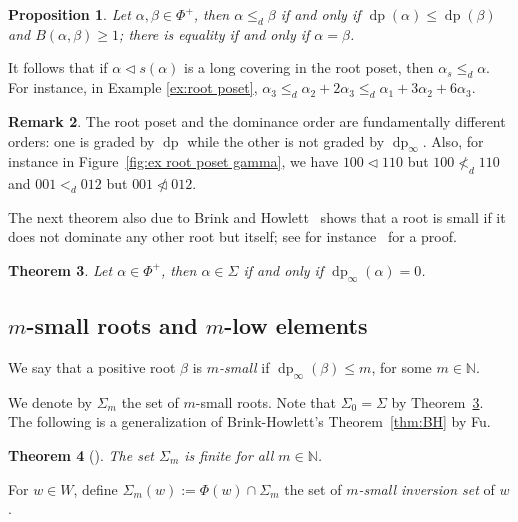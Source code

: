 \documentclass{amsart}
\newtheorem{Theorem}{Theorem}[section]
\newtheorem{Proposition}[Theorem]{Proposition}
\theoremstyle{definition}
\newtheorem{Remark}[Theorem]{Remark}
\newcommand{\dep}{\operatorname{dp}}
\begin{document}
\begin{Proposition}\label{prop:dom}
    Let $\alpha,\beta\in\Phi^+$, then $\alpha\leq_d\beta$ if and only if $\dep(\alpha)\leq \dep(\beta)$ and $B(\alpha, \beta)\geq 1$; there is equality if and only if $\alpha=\beta$.
\end{Proposition}


It follows that if $\alpha\lhd s(\alpha)$ is a long covering in the root poset, then $\alpha_s\leq_d \alpha$. For instance, in Example \ref{ex:root poset}, $\alpha_3\leq_d \alpha_2+2\alpha_3 \leq_d \alpha_1+ 3\alpha_2 + 6 \alpha_3$. \\

\begin{Remark} The root poset and the dominance order are fundamentally different orders: one is graded by $\dep$ while the other is not graded by $\dep_\infty$. Also, for instance in Figure~\ref{fig:ex root poset gamma}, we have $100\lhd 110$ but $100\not <_d 110$ and $001<_d 012$ but $001\ntriangleleft 012$.
\end{Remark}


The next theorem also due to Brink and Howlett~\cite{BH} shows that a root is small if it does not dominate any other root but itself; see for instance~\cite[Proposition~4.7.6]{BB} for a proof.

\begin{Theorem}
\label{th:small-dp}
    Let $\alpha\in\Phi^+$, then $\alpha\in\Sigma$ if and only if $\dep_\infty(\alpha)=0$.
\end{Theorem}

\subsection{$m$-small roots and $m$-low elements}\label{ss:mSmallRoots}    We say that a positive root $\beta$ is {\em $m$-small} if $\dep_\infty(\beta)\leq m$, for some $m\in \mathbb{N}$. 

We denote by $\Sigma_m$ the set of $m$-small roots. Note that $\Sigma_0=\Sigma$ by Theorem~\ref{th:small-dp}. The following is a generalization of Brink-Howlett's Theorem~\ref{thm:BH} by Fu.

\begin{Theorem}[{\cite[Corollary~3.9]{Fu}}]
The set $\Sigma_m$ is finite for all $m\in \mathbb{N}$.  
\end{Theorem}


 For $w\in W$, define $\Sigma_m(w):=\Phi(w)\cap \Sigma_m$ the set of \textit{$m$-small inversion set} of $w$.
\end{document}
